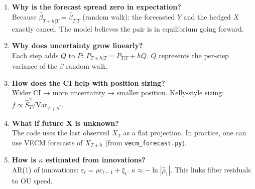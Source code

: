\documentclass[10pt,a4paper,twocolumn]{article}
\begin{document}
\begin{tcolorbox}[exbox={Key Interview Questions}]
\begin{enumerate}\setlength\itemsep{2pt}
  \item \textbf{Why is the forecast spread zero in expectation?}\\
    Because $\hat\beta_{T+h|T} = \hat\beta_{T|T}$ (random walk): the forecasted
    $Y$ and the hedged $X$ exactly cancel.  The model believes the pair is in
    equilibrium going forward.
  \item \textbf{Why does uncertainty grow linearly?}\\
    Each step adds $Q$ to $P$: $P_{T+h|T} = P_{T|T} + hQ$.  $Q$ represents
    the per-step variance of the $\beta$ random walk.
  \item \textbf{How does the CI help with position sizing?}\\
    Wider CI → more uncertainty → smaller position.  Kelly-style sizing:
    $f \propto \hat{S}_T^2 / \mathrm{Var}_{T+h^*}$.
  \item \textbf{What if future X is unknown?}\\
    The code uses the last observed $X_T$ as a flat projection.  In practice,
    one can use VECM forecasts of $X_{T+h}$ (from \texttt{vecm\_forecast.py}).
  \item \textbf{How is $\kappa$ estimated from innovations?}\\
    AR(1) of innovations: $\varepsilon_t = \rho\varepsilon_{t-1} + \xi_t$.
    $\kappa \approx -\ln|\hat\rho_1|$.  This links filter residuals to OU speed.
\end{enumerate}
\end{tcolorbox}
\end{document}

